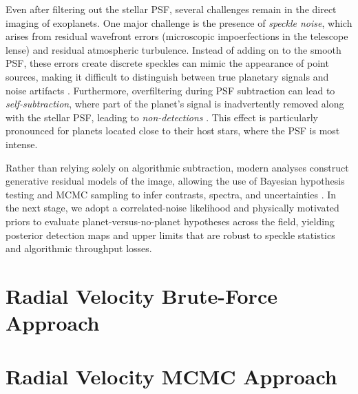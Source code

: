 \documentclass[preprint,longauthor]{aastex631}
\numberwithin{equation}{section}
\begin{document}
Even after filtering out the stellar PSF, several challenges remain in the direct imaging of exoplanets. One major challenge is the presence of \textit{speckle noise}, which arises from residual wavefront errors (microscopic impoerfections in the telescope lense) and residual atmospheric turbulence. Instead of adding on to the smooth PSF, these errors create discrete speckles can mimic the appearance of point sources, making it difficult to distinguish between true planetary signals and noise artifacts \citep{fischerExoplanetDetectionTechniques2014b}. Furthermore, overfiltering during PSF subtraction can lead to \textit{self-subtraction}, where part of the planet's signal is inadvertently removed along with the stellar PSF, leading to \textit{non-detections} \citep{kaushikExoplanetDetectionDetailed2024}. This effect is particularly pronounced for planets located close to their host stars, where the PSF is most intense.

Rather than relying solely on algorithmic subtraction, modern analyses construct generative residual models of the image, allowing the use of Bayesian hypothesis testing and MCMC sampling to infer contrasts, spectra, and uncertainties \citep{ruffioBayesianFrameworkExoplanet2018}. In the next stage, we adopt a correlated-noise likelihood and physically motivated priors to evaluate planet-versus-no-planet hypotheses across the field, yielding posterior detection maps and upper limits that are robust to speckle statistics and algorithmic throughput losses.

\appendix
\section[Appendix A]{Radial Velocity Brute-Force Approach}
\label{appx:A}



\section[Appendix B]{Radial Velocity MCMC Approach}
\label{appx:B}




\end{document}
